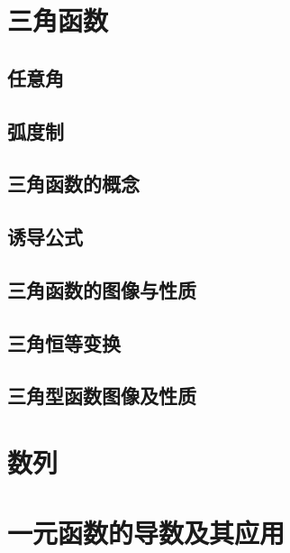 \documentclass[../main.tex]{subfiles}
\begin{document}
\section{三角函数}

\subsection{任意角}

\subsection{弧度制}

\subsection{三角函数的概念}

\subsection{诱导公式}

\subsection{三角函数的图像与性质}

\subsection{三角恒等变换}

\subsection{三角型函数图像及性质}

\section{数列}

\section{一元函数的导数及其应用}
\end{document}
